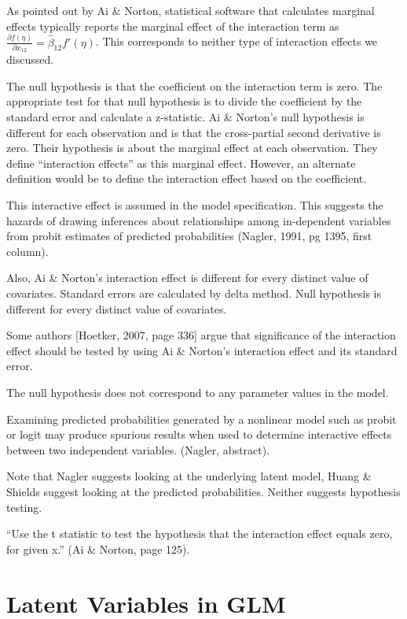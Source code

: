As pointed out by Ai \& Norton, statistical software that calculates
marginal effects typically reports the marginal effect of the
interaction term as $\frac{\partial f(\eta)}{\partial x_{12}}=\hat
\beta_{12} f'(\eta)$.  This corresponds to neither type of interaction
effects we discussed.

The null hypothesis is that the coefficient on the interaction term is
zero. The appropriate test for that null hypothesis is to divide the
coefficient by the standard error and calculate a z-statistic.  Ai \&
Norton’s null hypothesis is different for each observation and is
that the cross-partial second derivative is zero. Their hypothesis is
about the marginal effect at each observation. They
define “interaction effects” as this marginal effect.  However, an
alternate definition would be to define the interaction effect based
on the coefficient.


This interactive effect is assumed in the model specification.  This
suggests the hazards of drawing inferences about relationships among
in-dependent variables from probit estimates of predicted
probabilities (Nagler, 1991, pg 1395, first column).



Also, Ai \& Norton's interaction effect is different for every
distinct value of covariates.  Standard errors are calculated by delta
method.    Null hypothesis is different for every distinct value of covariates.

Some authors [Hoetker, 2007, page 336] argue that significance of the
interaction effect should be tested by using Ai \& Norton's
interaction effect and its standard error.

The null hypothesis does not correspond to any parameter values in the model.

Examining predicted probabilities generated by a nonlinear model such
as probit or logit may produce spurious results when used to determine
interactive effects between two independent variables.  (Nagler,
abstract).

Note that Nagler suggests looking at the underlying latent model,
Huang \& Shields suggest looking at the predicted probabilities.
Neither suggests hypothesis testing.

“Use the t statistic to test the hypothesis that the interaction
effect equals zero, for given x.”  (Ai \& Norton, page 125).



\section{Latent Variables in GLM}

